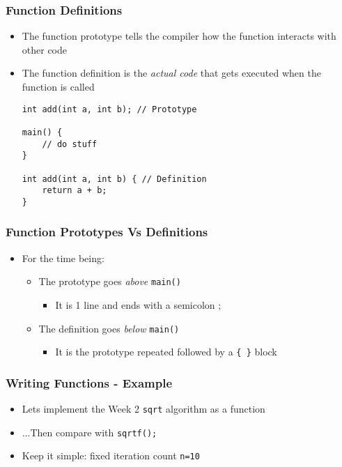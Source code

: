 \documentclass[14pt]{beamer}
\begin{document}
\begin{frame}[fragile]
\frametitle{Function Definitions}
\begin{itemize}
\item The function prototype tells the compiler how the function interacts with other code
\item The function definition is the \textit{actual code} that gets executed when the function is called
\begin{lstlisting}[style=CStyle]
int add(int a, int b); // Prototype

main() {
	// do stuff
}

int add(int a, int b) { // Definition
	return a + b;
}
\end{lstlisting}
\end{itemize}
\end{frame}

\begin{frame}
\frametitle{Function Prototypes Vs Definitions}
\begin{itemize}
\item For the time being:
\begin{itemize}
	\item The prototype goes \textit{above} \texttt{main()}
		\begin{itemize}
			\item It is 1 line and ends with a semicolon ;
		\end{itemize}
	\item The definition goes \textit{below} \texttt{main()}
		\begin{itemize}
			\item It is the prototype repeated followed by a \texttt{\{ \}} block
		\end{itemize}
\end{itemize}
\end{itemize}
\end{frame}

\begin{frame}[fragile]
\frametitle{Writing Functions - Example}
\begin{itemize}
\item Lets implement the Week 2 \texttt{sqrt} algorithm as a function
\item ...Then compare with \texttt{sqrtf();}
\item Keep it simple: fixed iteration count \texttt{n=10}

\end{itemize}
\end{frame}
\end{document}
